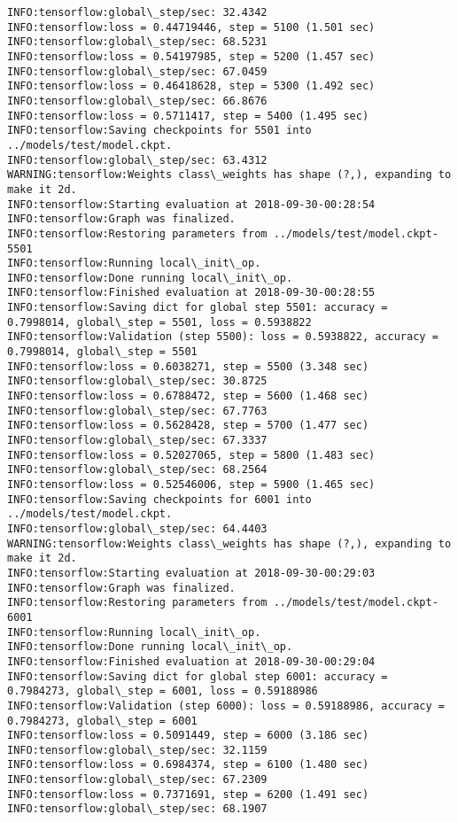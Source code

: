 \documentclass[11pt]{article}
\begin{document}
\begin{Verbatim}[commandchars=\\\{\}]
INFO:tensorflow:global\_step/sec: 32.4342
INFO:tensorflow:loss = 0.44719446, step = 5100 (1.501 sec)
INFO:tensorflow:global\_step/sec: 68.5231
INFO:tensorflow:loss = 0.54197985, step = 5200 (1.457 sec)
INFO:tensorflow:global\_step/sec: 67.0459
INFO:tensorflow:loss = 0.46418628, step = 5300 (1.492 sec)
INFO:tensorflow:global\_step/sec: 66.8676
INFO:tensorflow:loss = 0.5711417, step = 5400 (1.495 sec)
INFO:tensorflow:Saving checkpoints for 5501 into ../models/test/model.ckpt.
INFO:tensorflow:global\_step/sec: 63.4312
WARNING:tensorflow:Weights class\_weights has shape (?,), expanding to make it 2d.
INFO:tensorflow:Starting evaluation at 2018-09-30-00:28:54
INFO:tensorflow:Graph was finalized.
INFO:tensorflow:Restoring parameters from ../models/test/model.ckpt-5501
INFO:tensorflow:Running local\_init\_op.
INFO:tensorflow:Done running local\_init\_op.
INFO:tensorflow:Finished evaluation at 2018-09-30-00:28:55
INFO:tensorflow:Saving dict for global step 5501: accuracy = 0.7998014, global\_step = 5501, loss = 0.5938822
INFO:tensorflow:Validation (step 5500): loss = 0.5938822, accuracy = 0.7998014, global\_step = 5501
INFO:tensorflow:loss = 0.6038271, step = 5500 (3.348 sec)
INFO:tensorflow:global\_step/sec: 30.8725
INFO:tensorflow:loss = 0.6788472, step = 5600 (1.468 sec)
INFO:tensorflow:global\_step/sec: 67.7763
INFO:tensorflow:loss = 0.5628428, step = 5700 (1.477 sec)
INFO:tensorflow:global\_step/sec: 67.3337
INFO:tensorflow:loss = 0.52027065, step = 5800 (1.483 sec)
INFO:tensorflow:global\_step/sec: 68.2564
INFO:tensorflow:loss = 0.52546006, step = 5900 (1.465 sec)
INFO:tensorflow:Saving checkpoints for 6001 into ../models/test/model.ckpt.
INFO:tensorflow:global\_step/sec: 64.4403
WARNING:tensorflow:Weights class\_weights has shape (?,), expanding to make it 2d.
INFO:tensorflow:Starting evaluation at 2018-09-30-00:29:03
INFO:tensorflow:Graph was finalized.
INFO:tensorflow:Restoring parameters from ../models/test/model.ckpt-6001
INFO:tensorflow:Running local\_init\_op.
INFO:tensorflow:Done running local\_init\_op.
INFO:tensorflow:Finished evaluation at 2018-09-30-00:29:04
INFO:tensorflow:Saving dict for global step 6001: accuracy = 0.7984273, global\_step = 6001, loss = 0.59188986
INFO:tensorflow:Validation (step 6000): loss = 0.59188986, accuracy = 0.7984273, global\_step = 6001
INFO:tensorflow:loss = 0.5091449, step = 6000 (3.186 sec)
INFO:tensorflow:global\_step/sec: 32.1159
INFO:tensorflow:loss = 0.6984374, step = 6100 (1.480 sec)
INFO:tensorflow:global\_step/sec: 67.2309
INFO:tensorflow:loss = 0.7371691, step = 6200 (1.491 sec)
INFO:tensorflow:global\_step/sec: 68.1907

\end{Verbatim}
\end{document}
